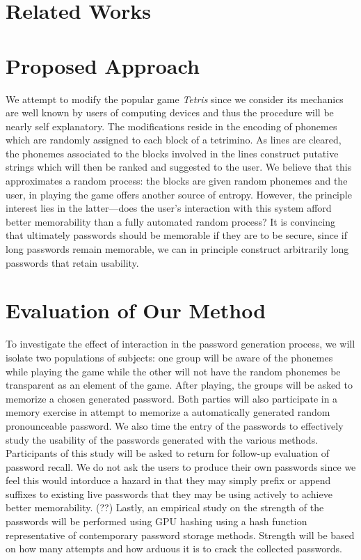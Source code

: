 \documentclass[conference]{IEEEtran}
\begin{document}
\section{Related Works}

\section{Proposed Approach}
We attempt to modify the popular game \emph{Tetris} since we consider its mechanics are well known by users of computing devices and thus the procedure will be nearly self explanatory. The modifications reside in the encoding of phonemes which are randomly assigned to each block of a tetrimino. As lines are cleared, the phonemes associated to the blocks involved in the lines construct putative strings which will then be ranked and suggested to the user. We believe that this approximates a random process: the blocks are given random phonemes and the user, in playing the game offers another source of entropy. However, the principle interest lies in the latter---does the user's interaction with this system afford better memorability than a fully automated random process? It is convincing that ultimately passwords should be memorable if they are to be secure, since if long passwords remain memorable, we can in principle construct arbitrarily long passwords that retain usability.

\section{Evaluation of Our Method}
To investigate the effect of interaction in the password generation process, we will isolate two populations of subjects: one group will be aware of the phonemes while playing the game while the other will not have the random phonemes be transparent as an element of the game. After playing, the groups will be asked to memorize a chosen generated password. Both parties will also participate in a memory exercise in attempt to memorize a automatically generated random pronounceable password. We also time the entry of the passwords to effectively study the usability of the passwords generated with the various methods. Participants of this study will be asked to return for follow-up evaluation of password recall. We do not ask the users to produce their own passwords since we feel this would intorduce a hazard in that they may simply prefix or append suffixes to existing live passwords that they may be using actively to achieve better memorability. (??) Lastly, an empirical study on the strength of the passwords will be performed using GPU hashing using a hash function representative of contemporary password storage methods. Strength will be based on how many attempts and how arduous it is to crack the collected passwords.
\end{document}
